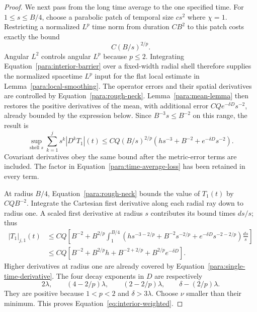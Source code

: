\begin{proof}
We next pass from the long time average to the one specified time.
For $1\le s\le B/4$, choose a parabolic patch of temporal size
$cs^2$ where $\chi=1$.  Restricting a normalized $L^p$ time norm
from duration $CB^2$ to this patch costs exactly the bound
\begin{equation}
 C(B/s)^{2/p}.
 \label{para:time-average-loss}
\end{equation}
Angular $L^2$ controls angular $L^p$ because $p\le2$.
Integrating Equation~\eqref{para:interior-barrier} over a fixed-width
radial shell therefore supplies the normalized spacetime $L^p$
input for the flat local estimate in Lemma~\ref{para:local-smoothing}.
The operator errors and their spatial derivatives are controlled
by Equation~\eqref{para:rough-neck}.  Lemma~\ref{para:mean-lemma}
then restores the positive derivatives of the mean, with additional
error $CQe^{-\delta D}s^{-2}$, already bounded by the expression
below.  Since $B^{-3}s\le B^{-2}$ on this range, the result is
\begin{equation}
 \sup_{\text{shell }s}\sum_{k=1}^j s^k|D^kT_1|(t)
 \le CQ(B/s)^{2/p}
        \left(hs^{-3}+B^{-2}+e^{-\delta D}s^{-2}\right).
 \label{para:single-time-derivative}
\end{equation}
Covariant derivatives obey the same bound after the metric-error
terms are included.  The factor in Equation~\eqref{para:time-average-loss}
has been retained in every term.

At radius $B/4$, Equation~\eqref{para:rough-neck} bounds the value
of $T_1(t)$ by $CQB^{-2}$.  Integrate the Cartesian first derivative
along each radial ray down to radius one.  A scaled first derivative
at radius $s$ contributes its bound times $ds/s$; thus
\[
 \begin{split}
 |T_1|_{j,1}(t)
 &\le CQ\left[B^{-2}
   +B^{2/p}\int_1^{B/4}
       \left(hs^{-3-2/p}+B^{-2}s^{-2/p}
                      +e^{-\delta D}s^{-2-2/p}\right)\frac{ds}{s}\right]\\
 &\le CQ\left[B^{-2}+B^{2/p}h+B^{-2+2/p}
                                      +B^{2/p}e^{-\delta D}\right].
 \end{split}
\]
Higher derivatives at radius one are already covered by
Equation~\eqref{para:single-time-derivative}.  The four decay
exponents in $D$ are respectively
\[
 2\lambda,\qquad(4-2/p)\lambda,\qquad
 (2-2/p)\lambda,\qquad\delta-(2/p)\lambda.
\]
They are positive because $1<p<2$ and $\delta>3\lambda$.
Choose $\nu$ smaller than their minimum.  This proves
Equation~\eqref{eq:interior-weighted}.
\end{proof}

